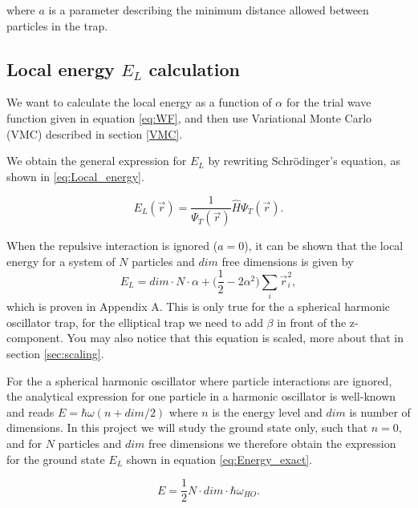 \documentclass[norsk,a4paper,12pt]{article}
\begin{document}
where $a$ is a parameter describing the minimum distance allowed between particles in the trap.

\subsection{Local energy $E_L$ calculation}

We want to calculate the local energy as a function of $\alpha$ for the trial wave function given in equation \ref{eq:WF}, and then use Variational Monte Carlo (VMC) described in section \ref{VMC}. 

We obtain the general  expression for $E_L$ by rewriting Schr\"{o}dinger's equation, as shown in \ref{eq:Local_energy}.

\begin{equation}
E_L(\vec{r})=\frac{1}{\Psi_T(\vec{r})}\hat{H}\Psi_T(\vec{r}).
\label{eq:Local_energy}
\end{equation}

When the repulsive interaction is ignored ($a=0$), it can be shown that the local energy for a system of $N$ particles and $dim$ free dimensions is given by
\begin{equation}
E_L=dim\cdot N\cdot \alpha + \Big(\frac{1}{2}-2\alpha^2\Big)\sum_i\vec{r}_i^2,
\end{equation}
which is proven in Appendix A. This is only true for the a spherical harmonic oscillator trap, for the elliptical trap we need to add $\beta$ in front of the z-component. You may also notice that this equation is scaled, more about that in section \ref{sec:scaling}.

For the a spherical harmonic oscillator where particle interactions are ignored, the analytical expression for one particle in a harmonic oscillator is well-known and reads $E = \hbar\omega(n + dim/2)$ where $n$ is the energy level and $dim$ is number of dimensions. In this project we will study the ground state only, such that $n=0$, and for $N$ particles and $dim$ free dimensions we therefore obtain the expression for the ground state $E_L$ shown in equation \ref{eq:Energy_exact}.

\begin{equation}
E = \frac{1}{2}N\cdot dim\cdot\hbar\omega_{HO}.
\label{eq:Energy_exact}
\end{equation}
\end{document}
